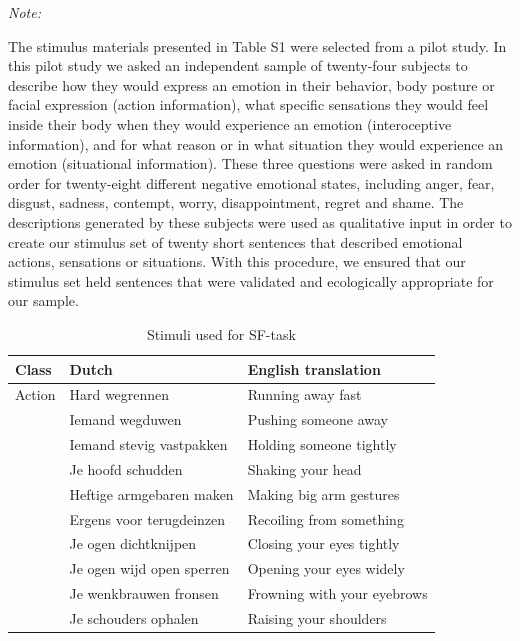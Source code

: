 \documentclass[12pt,american,a4paper,oneside,]{memoir} %
\begin{document}
\begin{ThreePartTable}
\begin{TableNotes}[para]
\item \textit{Note: } 
\item The stimulus materials presented in Table S1 were selected from a pilot study. In this pilot study we asked an independent sample of twenty-four subjects to describe how they would express an emotion in their behavior, body posture or facial expression (action information), what specific sensations they would feel inside their body when they would experience an emotion (interoceptive information), and for what reason or in what situation they would experience an emotion (situational information). These three questions were asked in random order for twenty-eight different negative emotional states, including anger, fear, disgust, sadness, contempt, worry, disappointment, regret and shame. The descriptions generated by these subjects were used as qualitative input in order to create our stimulus set of twenty short sentences that described emotional actions, sensations or situations. With this procedure, we ensured that our stimulus set held sentences that were validated and ecologically appropriate for our sample.
\end{TableNotes}
\begin{longtabu} to 
\caption{\label{tab:tab-shared-states-S1}Stimuli used for SF-task}\\
\toprule
Class & Dutch & English translation\\
\midrule
Action & Hard wegrennen & Running away fast\\
 & Iemand wegduwen & Pushing someone away\\
 & Iemand stevig vastpakken & Holding someone tightly\\
 & Je hoofd schudden & Shaking your head\\
 & Heftige armgebaren maken & Making big arm gestures\\
\addlinespace
 & Ergens voor terugdeinzen & Recoiling from something\\
 & Je ogen dichtknijpen & Closing your eyes tightly\\
 & Je ogen wijd open sperren & Opening your eyes widely\\
 & Je wenkbrauwen fronsen & Frowning with your eyebrows\\
 & Je schouders ophalen & Raising your shoulders\\

\end{longtabu}
\end{ThreePartTable}
\end{document}
